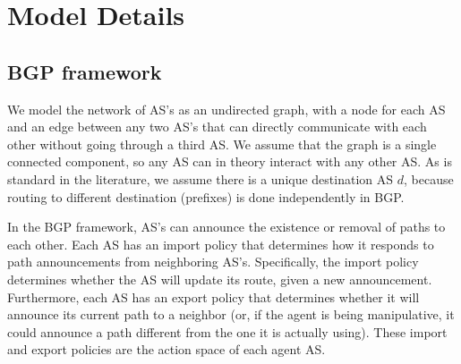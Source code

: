 \documentclass[10pt]{article}
\begin{document}

\section{Model Details}
  \subsection{BGP framework}
    We model the network of AS's as an undirected graph, with a node for each AS
    and an edge between any two AS's that can directly communicate with each other
    without going through a third AS. We assume that the graph is a single
    connected component, so any AS can in theory interact with any other AS.
    As is standard in the literature, we assume there is a unique destination AS
    $d$, because routing to different destination (prefixes) is done
    independently in BGP.

    In the BGP framework, AS's can announce the
    existence or removal of paths to each other.
    Each AS has an import policy that
    determines how it responds to path announcements from neighboring AS's.
    Specifically, the import policy determines whether the AS will update
    its route, given a new announcement.
    Furthermore, each AS has an export policy that determines whether it will
    announce its current path to a neighbor (or, if the agent is being
    manipulative, it could announce a path different from the one it is actually
    using). These import and export policies are the action space of each agent AS.
\end{document}
